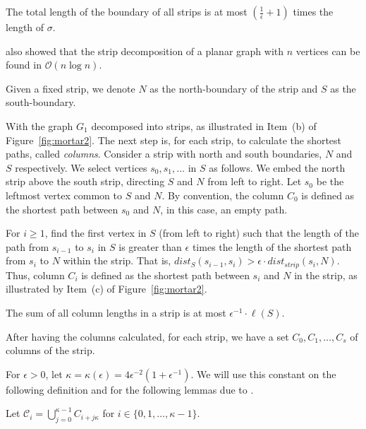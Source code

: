 \begin{lemma} \label{strip_length}
The total length of the boundary of all strips is at most \((\frac{1}{\epsilon} + 1)\) times the length of \(\sigma\).
\end{lemma}

\citeauthor{klein2006} also showed that the strip decomposition of a planar graph with \(n\) vertices can be found in \(\mathcal{O}(n \log n)\).

Given a fixed strip, we denote \(N\) as the north-boundary of the strip and \(S\) as the south-boundary.

With the graph \(G_1\) decomposed into strips, as illustrated in Item~(b) of Figure~\ref{fig:mortar2}. The next step is, for each strip, to calculate the shortest paths, called \textit{columns}. Consider a strip with north and south boundaries, \(N\) and \(S\) respectively. We select vertices \(s_0, s_1, \dots\) in \(S\) as follows. We embed the north strip above the south strip, directing \(S\) and \(N\) from left to right. Let \(s_0\) be the leftmost vertex common to \(S\) and \(N\). By convention, the column \(C_0\) is defined as the shortest path between \(s_0\) and \(N\), in this case, an empty path.

For \(i \geq 1\), find the first vertex in \(S\) (from left to right) such that the length of the path from \(s_{i-1}\) to \(s_i\) in \(S\) is greater than \(\epsilon\) times the length of the shortest path from \(s_i\) to \(N\) within the strip. That is, \(dist_S(s_{i-1}, s_i) > \epsilon \cdot dist_{strip}(s_i, N)\). Thus, column \(C_i\) is defined as the shortest path between \(s_i\) and \(N\) in the strip, as illustrated by Item~(c) of Figure~\ref{fig:mortar2}.

\begin{lemma}
The sum of all column lengths in a strip is at most \(\epsilon^{-1} \cdot \ell(S)\).
\end{lemma}

After having the columns calculated, for each strip, we have a set \(C_0, C_1, \dots, C_s\) of columns of the strip.

For \(\epsilon > 0\), let \(\kappa = \kappa(\epsilon) = 4 \epsilon ^ {-2} (1 + \epsilon ^ {-1})\). We will use this constant on the following definition and for the following lemmas due to \cite{Borradaile2009b}.

Let \(\mathcal{C}_i = \bigcup_{j=0}^{\kappa-1} C_{i+j\kappa}\) for \(i \in \{0, 1, \dots, \kappa - 1\}\).

